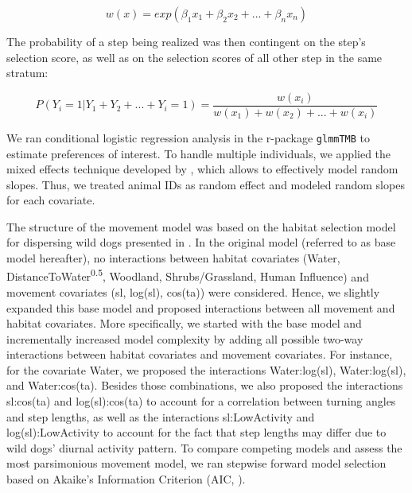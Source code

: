 \documentclass[abstract=on,10pt,a4paper,bibliography=totocnumbered]{article}
\begin{document}
\begin{equation}
\label{EQ1}
  w(x) = exp(\beta_1 x_1 + \beta_2 x_2 + ... + \beta_n x_n)
\end{equation}

The probability of a step being realized was then contingent on the step's
selection score, as well as on the selection scores of all other step in the
same stratum:

\begin{equation}
\label{EQ2}
  P(Y_{i} = 1 | Y_{1} + Y_{2} + ... + Y_{i} = 1) =
  \frac{w(x_{i})}{w(x_{1}) + w(x_{2}) + ... + w(x_{i})}
\end{equation}

We ran conditional logistic regression analysis in the r-package {\tt glmmTMB}
to estimate preferences of interest. To handle multiple individuals, we applied
the mixed effects technique developed by \citep{Muff.2020}, which allows to
effectively model random slopes. Thus, we treated animal IDs as random effect
and modeled random slopes for each covariate.

The structure of the movement model was based on the habitat selection model for
dispersing wild dogs presented in \cite{Hofmann.2021}. In the original model
(referred to as base model hereafter), no interactions between habitat
covariates (\textsf{Water, DistanceToWater\textsuperscript{0.5}, Woodland,
Shrubs/Grassland, Human Influence}) and movement covariates (\textsf{sl,
log(sl), cos(ta)}) were considered. Hence, we slightly expanded this base model
and proposed interactions between all movement and habitat covariates. More
specifically, we started with the base model and incrementally increased model
complexity by adding all possible two-way interactions between habitat
covariates and movement covariates. For instance, for the covariate
\textsf{Water}, we proposed the interactions \textsf{Water:log(sl)},
\textsf{Water:log(sl)}, and \textsf{Water:cos(ta)}. Besides those combinations,
we also proposed the interactions \textsf{sl:cos(ta)} and
\textsf{log(sl):cos(ta)} to account for a correlation between turning angles and
step lengths, as well as the interactions \textsf{sl:LowActivity} and
\textsf{log(sl):LowActivity} to account for the fact that step lengths may
differ due to wild dogs' diurnal activity pattern. To compare competing models
and assess the most parsimonious movement model, we ran stepwise forward model
selection based on Akaike's Information Criterion (AIC, \citealp{Burnham.2002}).
\end{document}
